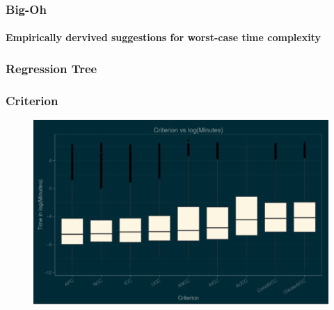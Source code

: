 \begin{frame}
  \frametitle{Big-Oh}
  \framesubtitle{Empirically dervived suggestions for worst-case time
    complexity}

  \begin{center}


\end{center}

\end{frame}

\begin{frame}
\frametitle{Regression Tree}
\centering


\end{frame}

\begin{frame}
\frametitle{Criterion}
\begin{figure}
\includegraphics[width=\textwidth]{CriterionBox}
\end{figure}

\vspace{-.10in}
\begin{figure}
\begin{centering}
\end{centering}
\end{figure}

\end{frame}

